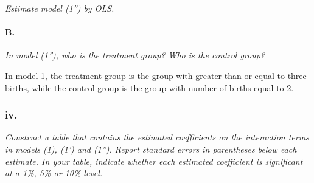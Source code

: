\documentclass[
]{article}
\newenvironment{Shaded}{\begin{snugshade}}{\end{snugshade}}
\newcommand{\CommentTok}[1]{\textcolor[rgb]{0.56,0.35,0.01}{\textit{#1}}}
\newcommand{\DataTypeTok}[1]{\textcolor[rgb]{0.13,0.29,0.53}{#1}}
\newcommand{\DecValTok}[1]{\textcolor[rgb]{0.00,0.00,0.81}{#1}}
\newcommand{\KeywordTok}[1]{\textcolor[rgb]{0.13,0.29,0.53}{\textbf{#1}}}
\newcommand{\NormalTok}[1]{#1}
\newcommand{\OperatorTok}[1]{\textcolor[rgb]{0.81,0.36,0.00}{\textbf{#1}}}
\newcommand{\StringTok}[1]{\textcolor[rgb]{0.31,0.60,0.02}{#1}}
\begin{document}
\emph{Estimate model (1'') by OLS.}

\begin{Shaded}
\end{Shaded}

\begin{Shaded}
\end{Shaded}

\hypertarget{b.-6}{%
\paragraph{B.}\label{b.-6}}

\emph{In model (1''), who is the treatment group? Who is the control
group?}

In model 1, the treatment group is the group with greater than or equal
to three births, while the control group is the group with number of
births equal to 2.

\hypertarget{iv.}{%
\subsubsection{iv.}\label{iv.}}

\emph{Construct a table that contains the estimated coefficients on the
interaction terms in models (1), (1') and (1''). Report standard errors
in parentheses below each estimate. In your table, indicate whether each
estimated coefficient is significant at a 1\%, 5\% or 10\% level.}
\end{document}
